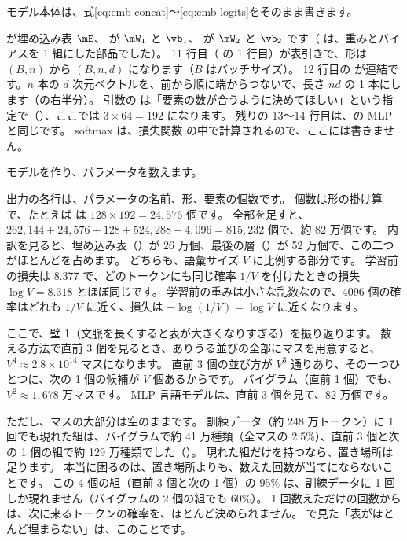 モデル本体は、式\eqref{eq:emb-concat}〜\eqref{eq:emb-logits}をそのまま書きます。


 が埋め込み表 $\mE$、 が $\mW_1$ と $\vb_1$、 が $\mW_2$ と $\vb_2$ です（ は、重みとバイアスを 1 組にした部品でした）。
11 行目（ の 1 行目）が表引きで、形は $(B,n)$ から $(B,n,d)$ になります（$B$ はバッチサイズ）。
12 行目の  が連結です。$n$ 本の $d$ 次元ベクトルを、前から順に端からつないで、長さ $nd$ の 1 本にします（の右半分）。
引数の  は「要素の数が合うように決めてほしい」という指定で（）、ここでは $3\times64=192$ になります。
残りの 13〜14 行目は、の MLP と同じです。
softmax は、損失関数  の中で計算されるので、ここには書きません。

モデルを作り、パラメータを数えます。


出力の各行は、パラメータの名前、形、要素の個数です。
個数は形の掛け算で、たとえば  は $128\times192=24{,}576$ 個です。
全部を足すと、$262{,}144+24{,}576+128+524{,}288+4{,}096=815{,}232$ 個で、約 82 万個です。
内訳を見ると、埋め込み表（）が 26 万個、最後の層（）が 52 万個で、この二つがほとんどを占めます。
どちらも、語彙サイズ $V$ に比例する部分です。
学習前の損失は 8.377 で、どのトークンにも同じ確率 $1/V$ を付けたときの損失 $\log V=8.318$ とほぼ同じです。
学習前の重みは小さな乱数なので、4096 個の確率はどれも $1/V$ に近く、損失は $-\log(1/V)=\log V$ に近くなります。

ここで、壁 1（文脈を長くすると表が大きくなりすぎる）を振り返ります。
数える方法で直前 3 個を見るとき、ありうる並びの全部にマスを用意すると、$V^4\approx 2.8\times10^{14}$ マスになります。
直前 3 個の並び方が $V^3$ 通りあり、その一つひとつに、次の 1 個の候補が $V$ 個あるからです。
バイグラム（直前 1 個）でも、$V^2\approx 1{,}678$ 万マスです。
MLP 言語モデルは、直前 3 個を見て、82 万個です。

ただし、マスの大部分は空のままです。
訓練データ（約 248 万トークン）に 1 回でも現れた組は、バイグラムで約 41 万種類（全マスの 2.5\%）、直前 3 個と次の 1 個の組で約 129 万種類でした（）。
現れた組だけを持つなら、置き場所は足ります。
本当に困るのは、置き場所よりも、数えた回数が当てにならないことです。
この 4 個の組（直前 3 個と次の 1 個）の 95\% は、訓練データに 1 回しか現れません（バイグラムの 2 個の組でも 60\%）。
1 回数えただけの回数からは、次に来るトークンの確率を、ほとんど決められません。
で見た「表がほとんど埋まらない」は、このことです。

